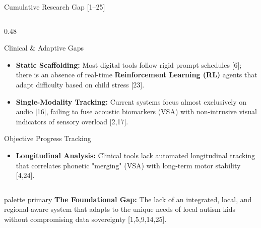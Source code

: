 \documentclass[aspectratio=169, 11pt]{beamer}
\begin{document}
\begin{frame}{Cumulative Research Gap [1--25]}
\begin{columns}[T, totalwidth=\textwidth]
        \begin{column}{0.48\textwidth}
            \begin{block}{\small Clinical \& Adaptive Gaps}
                \scriptsize
                \begin{itemize}
                    \item \textbf{Static Scaffolding:} Most digital tools follow rigid prompt schedules [6]; there is an absence of real-time \textbf{Reinforcement Learning (RL)} agents that adapt difficulty based on child stress [23].
                    \item \textbf{Single-Modality Tracking:} Current systems focus almost exclusively on audio [16], failing to fuse acoustic biomarkers (VSA) with non-intrusive visual indicators of sensory overload [2,17].
                \end{itemize}
            \end{block}
            
            \vspace{2mm}
            
            \begin{block}{\small Objective Progress Tracking}
                \scriptsize
                \begin{itemize}
                    \item \textbf{Longitudinal Analysis:} Clinical tools lack automated longitudinal tracking that correlates phonetic "merging" (VSA) with long-term motor stability [4,24].
                \end{itemize}
            \end{block}
        \end{column}
    \end{columns}

    \vspace{4mm}
    \begin{beamercolorbox}[sep=4pt, center, rounded=true]{palette primary}
        \footnotesize \textbf{The Foundational Gap:} The lack of an integrated, local, and regional-aware system that adapts to the unique needs of local autism kids without compromising data sovereignty [1,5,9,14,25].
    \end{beamercolorbox}
\end{frame}

\end{document}
